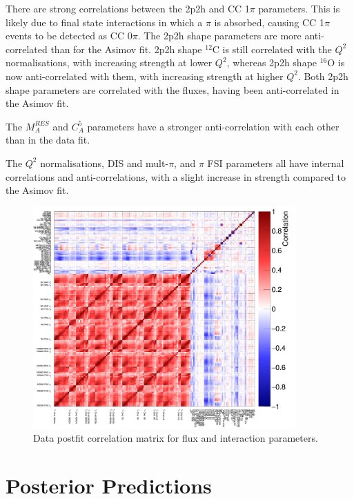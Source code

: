 There are strong correlations between the 2p2h and CC 1$\pi$ parameters. This is likely due to final state interactions in which a $\pi$ is absorbed, causing CC 1$\pi$ events to be detected as CC 0$\pi$. The 2p2h shape parameters are more anti-correlated than for the Asimov fit. 2p2h shape $^{12}$C is still correlated with the $Q^2$ normalisations, with increasing strength at lower $Q^2$, whereas 2p2h shape $^{16}$O is now anti-correlated with them, with increasing strength at higher $Q^2$. Both 2p2h shape parameters are correlated with the fluxes, having been anti-correlated in the Asimov fit.

The $M_{A}^{RES}$ and $C_{A}^5$ parameters have a stronger anti-correlation with each other than in the data fit.

The $Q^2$ normalisations, DIS and mult-$\pi$, and $\pi$ FSI parameters all have internal correlations and anti-correlations, with a slight increase in strength compared to the Asimov fit. 

\begin{figure}[!htbp]
\centering
\includegraphics*[width=0.9\textwidth,clip]{figs/MaCh3DataCorr}
\caption{Data postfit correlation matrix for flux and interaction parameters.}\label{fig:datpostfitcov}
\end{figure}

\section{Posterior Predictions}\label{sec:respostpred}

